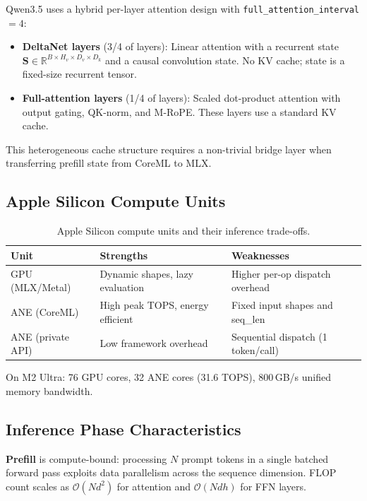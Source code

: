 \documentclass[11pt]{article}
\begin{document}
Qwen3.5 uses a hybrid per-layer attention design with
\texttt{full\_attention\_interval}$=4$:
\begin{itemize}[topsep=2pt,itemsep=1pt]
  \item \textbf{DeltaNet layers} (3/4 of layers): Linear attention with a
    recurrent state $\mathbf{S} \in \mathbb{R}^{B \times H_v \times D_v \times D_k}$
    and a causal convolution state.
    No KV cache; state is a fixed-size recurrent tensor.
  \item \textbf{Full-attention layers} (1/4 of layers): Scaled dot-product
    attention with output gating, QK-norm, and M-RoPE.
    These layers use a standard KV cache.
\end{itemize}

This heterogeneous cache structure requires a non-trivial bridge layer when
transferring prefill state from CoreML to MLX.

\subsection{Apple Silicon Compute Units}

\begin{table}[h]
\centering
\begin{tabular}{@{}lll@{}}
\toprule
Unit & Strengths & Weaknesses \\
\midrule
GPU (MLX/Metal) & Dynamic shapes, lazy evaluation & Higher per-op dispatch overhead \\
ANE (CoreML) & High peak TOPS, energy efficient & Fixed input shapes and seq\_len \\
ANE (private API) & Low framework overhead & Sequential dispatch (1 token/call) \\
\bottomrule
\end{tabular}
\caption{Apple Silicon compute units and their inference trade-offs.}
\label{tab:units}
\end{table}

\noindent
On M2 Ultra: 76 GPU cores, 32 ANE cores (31.6 TOPS),
800\,GB/s unified memory bandwidth.

\subsection{Inference Phase Characteristics}

\textbf{Prefill} is compute-bound: processing $N$ prompt tokens in a single
batched forward pass exploits data parallelism across the sequence dimension.
FLOP count scales as $\mathcal{O}(N d^2)$ for attention and
$\mathcal{O}(N d h)$ for FFN layers.
\end{document}
